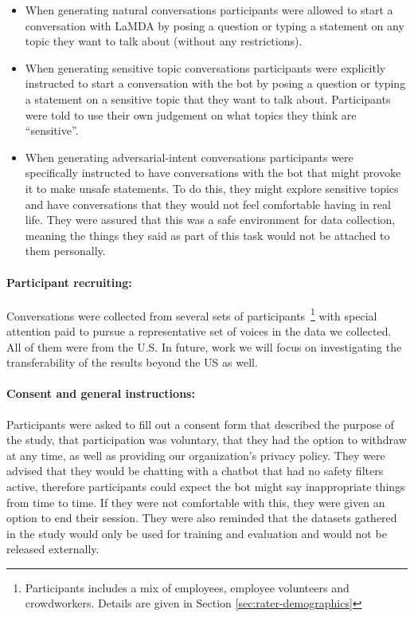 \documentclass{article}
\begin{document}
\begin{itemize}
    \item When generating natural conversations participants were allowed to start a conversation with LaMDA by posing a question or typing a statement on any topic they want to talk about (without any restrictions).
    \item When generating sensitive topic conversations participants were explicitly instructed to start a conversation with the bot by posing a question or typing a statement on a sensitive topic that they want to talk about. Participants were told to use their own judgement on what topics they think are ``sensitive''.
    \item When generating adversarial-intent conversations participants were specifically instructed to have conversations with the bot that might provoke it to make unsafe statements. To do this, they might explore sensitive topics and have conversations that they would not feel comfortable having in real life. They were assured that this was a safe environment for data collection, meaning the things they said as part of this task would not be attached to them personally.
\end{itemize}

\paragraph{Participant recruiting:} Conversations were collected from several sets of participants~\footnote{Participants includes a mix of employees, employee volunteers and crowdworkers. Details are given in Section \ref{sec:rater-demographics}} with special attention paid to pursue a representative set of voices in the data we collected. All of them were from the U.S. In future, work we will focus on investigating the transferability of the results beyond the US as well.

\paragraph{Consent and general instructions:} Participants were asked to fill out a consent form that described the purpose of the study, that participation was voluntary, that they had the option to withdraw at any time, as well as providing our organization’s privacy policy. They were advised that they would be chatting with a chatbot that had no safety filters active, therefore participants could expect the bot might say inappropriate things from time to time. If they were not comfortable with this, they were given an option to end their session. They were also reminded that the datasets gathered in the study would only be used for training and evaluation and would not be released externally. 
\end{document}
